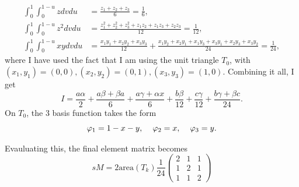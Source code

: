 \documentclass[aps, 12pt]{revtex4}
\begin{document}
\begin{align*}
    \int_0^1\int_0^{1-u}zdvdu   & = \frac{z_1+z_2+z_3}{6} = \frac{1}{6},
    \\
    \int_0^1\int_0^{1-u}z^2dvdu & = \frac{z_1^2+z_2^2+z_3^2+z_1z_2+z_1z_3+z_2z_3}{12} = \frac{1}{12},
    \\
    \int_0^1\int_0^{1-u}xydvdu  & = \frac{x_1y_1+x_2y_2+x_3y_3}{12}+\frac{x_1y_2+x_2y_1+x_1y_3+x_3y_1+x_2y_3+x_3y_2}{24} = \frac{1}{24},
\end{align*}
where I have used the fact that I am using the unit triangle $T_0$, with $(x_1,y_1)=(0,0), (x_2,y_2)=(0,1), (x_3,y_3)=(1,0)$.
Combining it all, I get
\begin{equation*}
    I = \frac{a\alpha}{2}+\frac{a\beta+\beta a}{6}+\frac{a\gamma+\alpha x}{6} + \frac{b\beta}{12}+\frac{c\gamma}{12}+\frac{b\gamma+\beta c}{24}.
\end{equation*}
On $T_0$, the 3 basis function takes the form
\begin{equation*}
    \varphi_1 = 1-x-y, \hspace{4mm} \varphi_2=x, \hspace{4mm} \varphi_3=y.
\end{equation*}

Evauluating this, the final element matrix becomes
\begin{equation*}
    sM = 2\text{area}(T_k)\frac{1}{24}\begin{pmatrix}
        2 & 1 & 1 \\ 1 & 2 & 1 \\ 1 & 1 & 2
    \end{pmatrix}
\end{equation*}
\end{document}
